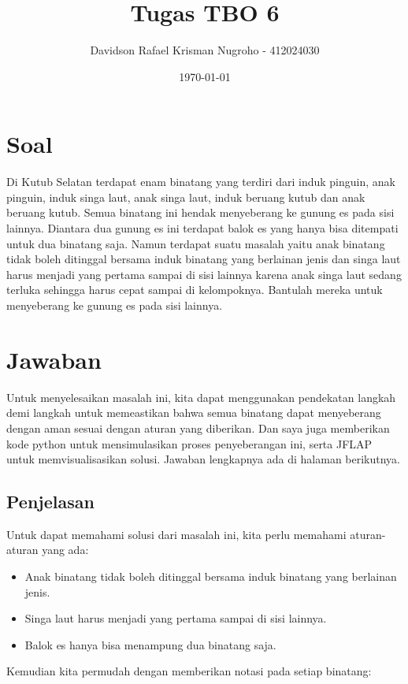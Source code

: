 \documentclass[12pt,a4paper]{article}
\begin{document}
\title{Tugas TBO 6}
\author{Davidson Rafael Krisman Nugroho - 412024030}
\date{\today}
\maketitle

\section*{Soal}
Di Kutub Selatan terdapat enam binatang yang terdiri dari induk pinguin, anak pinguin, induk
singa laut, anak singa laut, induk beruang kutub dan anak beruang kutub. Semua binatang ini
hendak menyeberang ke gunung es pada sisi lainnya. Diantara dua gunung es ini terdapat balok
es yang hanya bisa ditempati untuk dua binatang saja. Namun terdapat suatu masalah yaitu
anak binatang tidak boleh ditinggal bersama induk binatang yang berlainan jenis dan singa laut
harus menjadi yang pertama sampai di sisi lainnya karena anak singa laut sedang terluka
sehingga harus cepat sampai di kelompoknya. Bantulah mereka untuk menyeberang ke gunung es pada sisi lainnya.

\section*{Jawaban}
Untuk menyelesaikan masalah ini, kita dapat menggunakan pendekatan langkah demi langkah untuk memeastikan bahwa 
semua binatang dapat menyeberang dengan aman sesuai dengan aturan yang diberikan. Dan saya juga memberikan kode 
python untuk mensimulasikan proses penyeberangan ini, serta JFLAP untuk memvisualisasikan solusi. Jawaban lengkapnya ada di halaman berikutnya.

\newpage
\subsection*{Penjelasan}

Untuk dapat memahami solusi dari masalah ini, kita perlu memahami aturan-aturan yang ada:
\begin{itemize}
    \item Anak binatang tidak boleh ditinggal bersama induk binatang yang berlainan jenis.
    \item Singa laut harus menjadi yang pertama sampai di sisi lainnya.
    \item Balok es hanya bisa menampung dua binatang saja.
\end{itemize} \noindent
Kemudian kita permudah dengan memberikan notasi pada setiap binatang:
\end{document}
